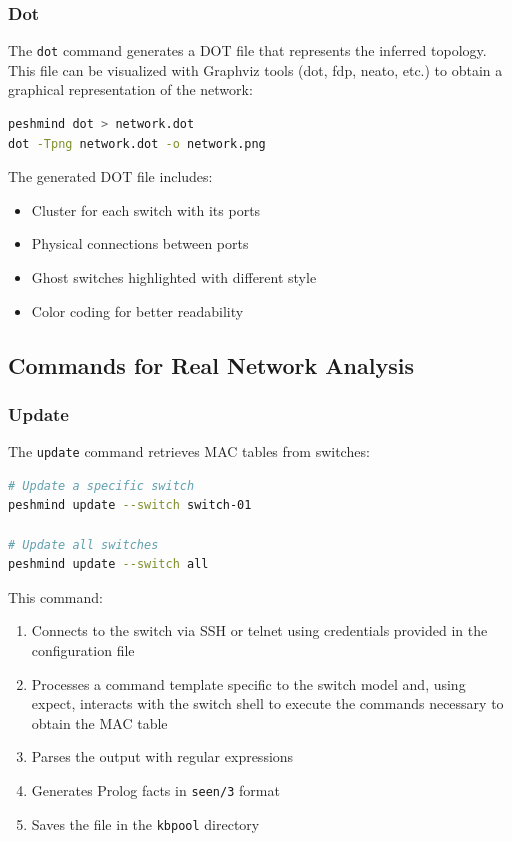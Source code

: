 \documentclass[12pt,a4paper]{article}
\begin{document}
\subsubsection{Dot}

The \texttt{dot} command generates a DOT file that represents the inferred topology. This file can be visualized 
with Graphviz tools (dot, fdp, neato, etc.) to obtain a graphical representation of the network: \\

\begin{lstlisting}[language=bash]
peshmind dot > network.dot
dot -Tpng network.dot -o network.png
\end{lstlisting}

The generated DOT file includes:
\begin{itemize}
    \item Cluster for each switch with its ports
    \item Physical connections between ports
    \item Ghost switches highlighted with different style
    \item Color coding for better readability
\end{itemize}

\subsection{Commands for Real Network Analysis}

\subsubsection{Update}

The \texttt{update} command retrieves MAC tables from switches: \\

\begin{lstlisting}[language=bash]
# Update a specific switch
peshmind update --switch switch-01

# Update all switches
peshmind update --switch all
\end{lstlisting}

This command:
\begin{enumerate}
    \item Connects to the switch via SSH or telnet using credentials provided in the configuration file
    \item Processes a command template specific to the switch model and, using expect, interacts with the switch shell to execute the commands necessary to obtain the MAC table
    \item Parses the output with regular expressions
    \item Generates Prolog facts in \texttt{seen/3} format
    \item Saves the file in the \texttt{kbpool} directory
\end{enumerate}
\end{document}
